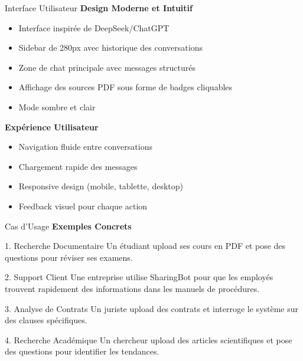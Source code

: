 \documentclass[aspectratio=169]{beamer}
\begin{document}
\begin{frame}{Interface Utilisateur}
    \textbf{Design Moderne et Intuitif}
    \begin{itemize}
        \item Interface inspirée de DeepSeek/ChatGPT
        \item Sidebar de 280px avec historique des conversations
        \item Zone de chat principale avec messages structurés
        \item Affichage des sources PDF sous forme de badges cliquables
        \item Mode sombre et clair
    \end{itemize}
    
    \vspace{0.5cm}
    
    \textbf{Expérience Utilisateur}
    \begin{itemize}
        \item Navigation fluide entre conversations
        \item Chargement rapide des messages
        \item Responsive design (mobile, tablette, desktop)
        \item Feedback visuel pour chaque action
    \end{itemize}
\end{frame}

\begin{frame}{Cas d'Usage}
    \textbf{Exemples Concrets}
    
    \begin{block}{1. Recherche Documentaire}
        Un étudiant upload ses cours en PDF et pose des questions pour réviser ses examens.
    \end{block}
    
    \begin{block}{2. Support Client}
        Une entreprise utilise SharingBot pour que les employés trouvent rapidement des informations dans les manuels de procédures.
    \end{block}
    
    \begin{block}{3. Analyse de Contrats}
        Un juriste upload des contrats et interroge le système sur des clauses spécifiques.
    \end{block}
    
    \begin{block}{4. Recherche Académique}
        Un chercheur upload des articles scientifiques et pose des questions pour identifier les tendances.
    \end{block}
\end{frame}
\end{document}
